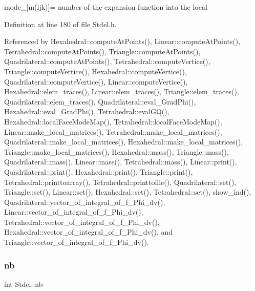 mode\+\_\+\mbox{[}m(ijk)\mbox{]}= number of the expansion function into the local 



Definition at line 180 of file Stdel.\+h.



Referenced by Hexahedral\+::compute\+At\+Points(), Linear\+::compute\+At\+Points(), Tetrahedral\+::compute\+At\+Points(), Triangle\+::compute\+At\+Points(), Quadrilateral\+::compute\+At\+Points(), Tetrahedral\+::compute\+Vertice(), Triangle\+::compute\+Vertice(), Hexahedral\+::compute\+Vertice(), Quadrilateral\+::compute\+Vertice(), Linear\+::compute\+Vertice(), Hexahedral\+::elem\+\_\+traces(), Linear\+::elem\+\_\+traces(), Triangle\+::elem\+\_\+traces(), Quadrilateral\+::elem\+\_\+traces(), Quadrilateral\+::eval\+\_\+\+Grad\+Phi(), Hexahedral\+::eval\+\_\+\+Grad\+Phi(), Tetrahedral\+::eval\+G\+Q(), Hexahedral\+::local\+Face\+Mode\+Map(), Tetrahedral\+::local\+Face\+Mode\+Map(), Linear\+::make\+\_\+local\+\_\+matrices(), Tetrahedral\+::make\+\_\+local\+\_\+matrices(), Quadrilateral\+::make\+\_\+local\+\_\+matrices(), Hexahedral\+::make\+\_\+local\+\_\+matrices(), Triangle\+::make\+\_\+local\+\_\+matrices(), Hexahedral\+::mass(), Triangle\+::mass(), Quadrilateral\+::mass(), Linear\+::mass(), Tetrahedral\+::mass(), Linear\+::print(), Quadrilateral\+::print(), Hexahedral\+::print(), Triangle\+::print(), Tetrahedral\+::printtoarray(), Tetrahedral\+::printtofile(), Quadrilateral\+::set(), Triangle\+::set(), Linear\+::set(), Hexahedral\+::set(), Tetrahedral\+::set(), show\+\_\+ind(), Quadrilateral\+::vector\+\_\+of\+\_\+integral\+\_\+of\+\_\+f\+\_\+\+Phi\+\_\+dv(), Linear\+::vector\+\_\+of\+\_\+integral\+\_\+of\+\_\+f\+\_\+\+Phi\+\_\+dv(), Tetrahedral\+::vector\+\_\+of\+\_\+integral\+\_\+of\+\_\+f\+\_\+\+Phi\+\_\+dv(), Hexahedral\+::vector\+\_\+of\+\_\+integral\+\_\+of\+\_\+f\+\_\+\+Phi\+\_\+dv(), and Triangle\+::vector\+\_\+of\+\_\+integral\+\_\+of\+\_\+f\+\_\+\+Phi\+\_\+dv().

\mbox{\label{classStdel_ad1d9acc38335d3fd779ba5c14f1507f8}} 
\subsubsection{\texorpdfstring{nb}{nb}}
{\footnotesize\ttfamily int Stdel\+::nb\hspace{0.3cm}{\ttfamily [protected]}}



